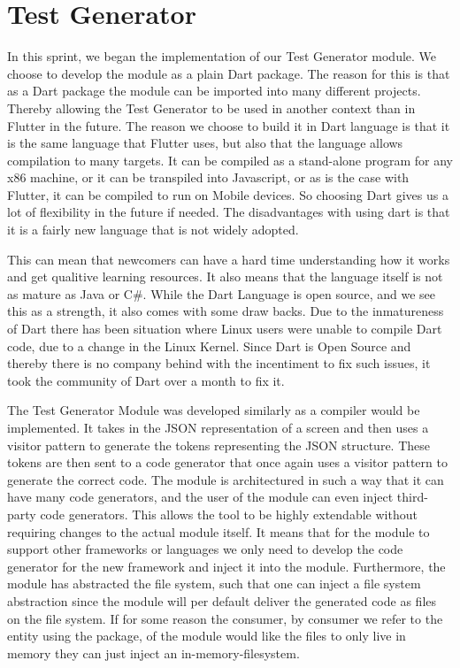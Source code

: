 \section{Test Generator}
In this sprint, we began the implementation of our Test Generator module. 
We choose to develop the module as a plain Dart package. 
The reason for this is that as a Dart package the module can be imported into many different projects.
Thereby allowing the Test Generator to be used in another context than in Flutter in the future.
The reason we choose to build it in Dart language is that it is the same language that Flutter uses, but also that the language allows compilation to many targets.
It can be compiled as a stand-alone program for any x86 machine, or it can be transpiled into Javascript, or as is the case with Flutter, it can be compiled to run on Mobile devices. 
So choosing Dart gives us a lot of flexibility in the future if needed.
The disadvantages with using dart is that it is a fairly new language that is not widely adopted.

This can mean that newcomers can have a hard time understanding how it works and get qualitive learning resources.
It also means that the language itself is not as mature as Java or C\#.
While the Dart Language is open source, and we see this as a strength, it also comes with some draw backs. 
Due to the inmatureness of Dart there has been situation where Linux users were unable to compile Dart code, due to a change in the Linux Kernel. 
Since Dart is Open Source and thereby there is no company behind with the incentiment to fix such issues, it took the community of Dart over a month to fix it.


The Test Generator Module was developed similarly as a compiler would be implemented.
It takes in the JSON representation of a screen and then uses a visitor pattern to generate the tokens representing the JSON structure.
These tokens are then sent to a code generator that once again uses a visitor pattern to generate the correct code.
The module is architectured in such a way that it can have many code generators, and the user of the module can even inject third-party code generators.
This allows the tool to be highly extendable without requiring changes to the actual module itself.
It means that for the module to support other frameworks or languages we only need to develop the code generator for the new framework and inject it into the module.
Furthermore, the module has abstracted the file system, such that one can inject a file system abstraction since the module will per default deliver the generated code as files on the file system. If for some reason the consumer, by consumer we refer to the entity using the package, of the module would like the files to only live in memory they can just inject an in-memory-filesystem.


